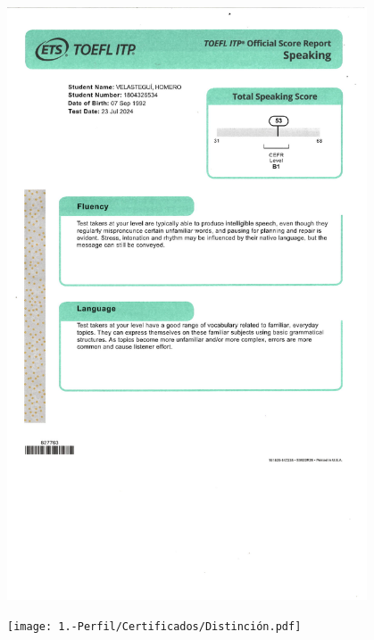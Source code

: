 {\begin{figure}[ht]
    \setlength{\parindent}{-10pt}
    \includegraphics[width=0.95\textwidth]{1.-Perfil/Certificados/Toefl_3.pdf}
\end{figure}



\begin{figure}[ht]
    \setlength{\parindent}{-10pt}
    \texttt{[image: 1.-Perfil/Certificados/Distinción.pdf]}
\end{figure}

}
